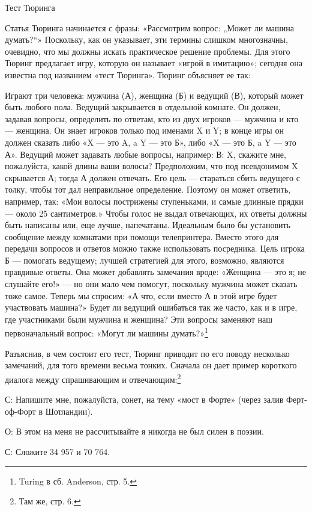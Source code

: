 Тест Тюринга

Статья Тюринга начинается с фразы: «Рассмотрим вопрос: „Может ли машина думать?{}``» Поскольку, как он указывает, эти термины слишком многозначны, очевидно, что мы должны искать практическое решение проблемы. Для этого Тюринг предлагает игру, которую он называет «игрой в имитацию»; сегодня она известна под названием «тест Тюринга». Тюринг объясняет ее так:

Играют три человека: мужчина (А), женщина (Б) и ведущий (В), который может быть любого пола. Ведущий закрывается в отдельной комнате. Он должен, задавая вопросы, определить по ответам, кто из двух игроков --- мужчина и кто --- женщина. Он знает игроков только под именами X и Y; в конце игры он должен сказать либо «X --- это A, a Y --- это Б», либо «X --- это Б, a Y --- это А». Ведущий может задавать любые вопросы, например: В: X, скажите мне, пожалуйста, какой длины ваши волосы? Предположим, что под псевдонимом X скрывается А; тогда А должен отвечать. Его цель --- стараться сбить ведущего с толку, чтобы тот дал неправильное определение. Поэтому он может ответить, например, так: «Мои волосы пострижены ступеньками, и самые длинные прядки --- около 25 сантиметров.» Чтобы голос не выдал отвечающих, их ответы должны быть написаны или, еще лучше, напечатаны. Идеальным было бы установить сообщение между комнатами при помощи телепринтера. Вместо этого для передачи вопросов и ответов можно также использовать посредника. Цель игрока Б --- помогать ведущему; лучшей стратегией для этого, возможно, являются правдивые ответы. Она может добавлять замечания вроде: «Женщина --- это я; не слушайте его!» --- но они мало чем помогут, поскольку мужчина может сказать тоже самое. Теперь мы спросим: «А что, если вместо А в этой игре будет участвовать машина?» Будет ли ведущий ошибаться так же часто, как и в игре, где участниками были мужчина и женщина? Эти вопросы заменяют наш первоначальный вопрос: «Могут ли машины думать?»\footnote{Turing в сб. Anderson, стр. 5.}

Разъяснив, в чем состоит его тест, Тюринг приводит по его поводу несколько замечаний, для того времени весьма тонких. Сначала он дает пример короткого диалога между спрашивающим и отвечающим:\footnote{Там же, стр. 6.}

С: Напишите мне, пожалуйста, сонет, на тему «мост в Форте» (через залив Ферт-оф-Форт в Шотландии).

О: В этом на меня не рассчитывайте я никогда не был силен в поэзии.

С: Сложите 34 957 и 70 764.

